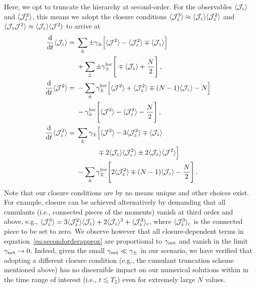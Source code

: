 \documentclass[aps,prd,10pt,twocolumn,superscriptaddress,floatfix,nofootinbib,amsmath,amssymb,altaffilletter,preprintnumbers]{revtex4-1}
\begin{document}
Here, we opt to truncate the hierarchy at second-order.  For the observables $\langle {\cal J}_z \rangle$ and $\langle {\cal J}_z^2 \rangle$, this means we adopt the closure conditions 
 $\langle {\cal J}_z^3 \rangle \approx \langle {\cal J}_z \rangle \langle {\cal J}_z^2 \rangle$ and $\langle {\cal J}_z {\cal J}^2\rangle\approx\langle {\cal J}_z \rangle\langle {\cal J}^2\rangle$ to arrive at~\cite{Shammah_2017}
 \begin{equation}
\begin{aligned}
    \frac{\rm d}{{\rm d}t} \langle {\cal J}_z \rangle = \; & \sum_\pm \pm \gamma_\pm  \Big[ \langle {\cal J}^2 \rangle - \langle {\cal J}_z^2 \rangle \mp \langle {\cal J}_z \rangle \Big] \, \\
    & + \sum_{\pm}\pm\gamma_{\pm}^{\rm loc} \Bigg[\mp\langle {\cal J}_z \rangle + \frac{N}{2} \Bigg] \, ,\\
    \frac{\rm d}{{\rm d}t} \langle {\cal J}^2 \rangle = \; &
    -\sum_{\pm} \gamma_\pm^{\rm loc} \Big[\langle {\cal J}^2 \rangle +\langle {\cal J}_z^2 \rangle \mp (N-1) \langle {\cal J}_z \rangle -N \Big] \\
\; &- \gamma_{\phi}^{\rm loc} \Bigg[ \langle {\cal J}^2 \rangle - \langle {\cal J}_z^2 \rangle - \frac{N}{2} \Bigg]\, ,\\ 
    \frac{\rm d}{{\rm d}t} \langle {\cal J}_z^2 \rangle = \; & 
\sum_{\pm}\gamma_{\pm} \Big[ \langle {\cal J}^2 \rangle - 3 \langle {\cal J}_z^2 \rangle\mp \langle {\cal J}_z \rangle 
     \\
    & \qquad \quad \mp 2 \langle {\cal J}_z \rangle \langle {\cal J}_z^2 \rangle 
    \pm 2 \langle {\cal J}_z \rangle \langle {\cal J}^2 \rangle \Big] \\
& - \sum_{\pm}\gamma_\pm^{\rm loc} \Bigg[ 2 \langle {\cal J}_z^2 \rangle\mp(N-1) \langle {\cal J}_z \rangle  -\frac{N}{2}\Bigg]\, .
    \label{eq:secondorderapprox}
\end{aligned}
\end{equation}
Note that our closure conditions are by no means unique and other choices exist. For example, closure can be achieved alternatively by demanding that all cumulants (i.e., connected pieces of the moments) vanish at third order and above, e.g., $\langle {\cal J}_z^3 \rangle = 3 \langle {\cal J}_z^2\rangle \langle {\cal J}_z\rangle + 2 \langle {\cal J}_z\rangle^3 + \langle {\cal J}_z^3 \rangle_c$, where $\langle {\cal J}_z^3 \rangle_c$ is the connected piece to be set to zero.
We observe however that all closure-dependent terms in equation~\eqref{eq:secondorderapprox} are proportional to $\gamma_{\rm net}$ and vanish in the limit $\gamma_{\rm net} \to 0$.  Indeed, given the small $\gamma_{\rm net} \ll \gamma_\pm$ in our scenario, we have verified that adopting a different closure condition  (e.g., the cumulant truncation scheme mentioned above) has no discernible impact on our numerical solutions within in the time range of interest (i.e., $t \lesssim T_2$) even for extremely large $N$ values.
\end{document}
